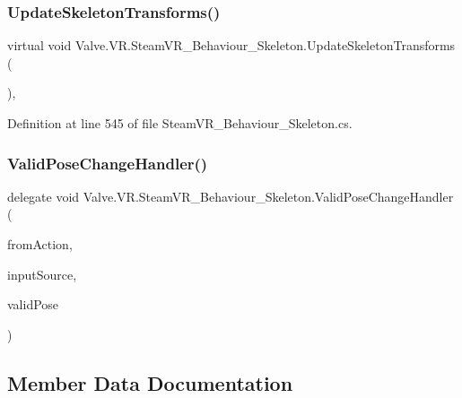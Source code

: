 \subsubsection{\texorpdfstring{UpdateSkeletonTransforms()}{UpdateSkeletonTransforms()}}
{\footnotesize\ttfamily virtual void Valve.\+V\+R.\+Steam\+V\+R\+\_\+\+Behaviour\+\_\+\+Skeleton.\+Update\+Skeleton\+Transforms (\begin{DoxyParamCaption}{ }\end{DoxyParamCaption})\hspace{0.3cm}{\ttfamily [protected]}, {\ttfamily [virtual]}}



Definition at line 545 of file Steam\+V\+R\+\_\+\+Behaviour\+\_\+\+Skeleton.\+cs.

\mbox{\label{class_valve_1_1_v_r_1_1_steam_v_r___behaviour___skeleton_a8fe9b3915e182d4b7b731a6ef858eb9e}} 
\subsubsection{\texorpdfstring{ValidPoseChangeHandler()}{ValidPoseChangeHandler()}}
{\footnotesize\ttfamily delegate void Valve.\+V\+R.\+Steam\+V\+R\+\_\+\+Behaviour\+\_\+\+Skeleton.\+Valid\+Pose\+Change\+Handler (\begin{DoxyParamCaption}\item[{\mbox{\hyperlink{class_valve_1_1_v_r_1_1_steam_v_r___behaviour___skeleton}{Steam\+V\+R\+\_\+\+Behaviour\+\_\+\+Skeleton}}}]{from\+Action,  }\item[{\mbox{\hyperlink{namespace_valve_1_1_v_r_a82e5bf501cc3aa155444ee3f0662853f}{Steam\+V\+R\+\_\+\+Input\+\_\+\+Sources}}}]{input\+Source,  }\item[{bool}]{valid\+Pose }\end{DoxyParamCaption})}



\subsection{Member Data Documentation}
\mbox{\label{class_valve_1_1_v_r_1_1_steam_v_r___behaviour___skeleton_a9a04b22affd00015ac920e5ad44051b2}} 
